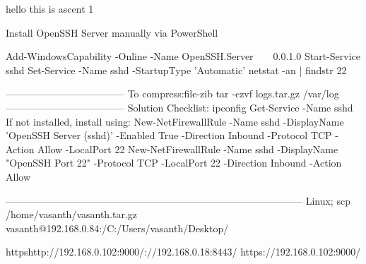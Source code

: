 hello this is ascent 1


Install OpenSSH Server manually via PowerShell

Add-WindowsCapability -Online -Name OpenSSH.Server~~~~0.0.1.0
Start-Service sshd
Set-Service -Name sshd -StartupType 'Automatic'
netstat -an | findstr 22

------------------------------------
       To compress:file-zib
tar -czvf logs.tar.gz /var/log
------------------------------------
         Solution Checklist:
ipconfig
Get-Service -Name sshd
If not installed, install using:
New-NetFirewallRule -Name sshd -DisplayName 'OpenSSH Server (sshd)' -Enabled True -Direction Inbound -Protocol TCP -Action Allow -LocalPort 22
New-NetFirewallRule -Name sshd -DisplayName "OpenSSH Port 22" -Protocol TCP -LocalPort 22 -Direction Inbound -Action Allow

------------------------------------------------------------------------------------------
Linux;
scp /home/vasanth/vasanth.tar.gz vasanth@192.168.0.84:/C:/Users/vasanth/Desktop/


httpshttp://192.168.0.102:9000/://192.168.0.18:8443/
		https://192.168.0.102:9000/
